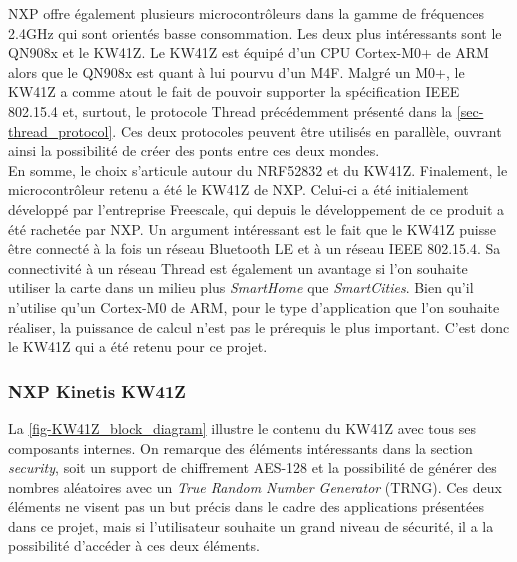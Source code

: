 NXP offre également plusieurs microcontrôleurs dans la gamme de fréquences 2.4GHz qui sont orientés basse consommation. Les deux plus intéressants sont le QN908x et le KW41Z. Le KW41Z est équipé d'un CPU Cortex-M0+ de ARM alors que le QN908x est quant à lui pourvu d'un M4F. Malgré un M0+, le KW41Z a comme atout le fait de pouvoir supporter la spécification IEEE 802.15.4 et, surtout, le protocole Thread précédemment présenté dans la \cref{sec-thread_protocol}. Ces deux protocoles peuvent être utilisés en parallèle, ouvrant ainsi la possibilité de créer des ponts entre ces deux mondes. \\


En somme, le choix s'articule autour du NRF52832 et du KW41Z. Finalement, le microcontrôleur retenu a été le KW41Z de NXP. Celui-ci a été initialement développé par l'entreprise Freescale, qui depuis le développement de ce produit a été rachetée par NXP. Un argument intéressant est le fait que le KW41Z puisse être connecté à la fois un réseau Bluetooth LE et à un réseau IEEE 802.15.4. Sa connectivité à un réseau Thread est également un avantage si l'on souhaite utiliser la carte dans un milieu plus \textit{SmartHome} que \textit{SmartCities}. Bien qu'il n'utilise qu'un Cortex-M0 de ARM, pour le type d'application que l'on souhaite réaliser, la puissance de calcul n'est pas le prérequis le plus important. C'est donc le KW41Z qui a été retenu pour ce projet. 

\FloatBarrier
\subsubsection{NXP Kinetis KW41Z}
\label{sec-hardware_kw41z}

La \cref{fig-KW41Z_block_diagram} illustre le contenu du KW41Z avec tous ses composants internes. On remarque des éléments intéressants dans la section \textit{security}, soit un support de chiffrement AES-128 et la possibilité de générer des nombres aléatoires avec un \textit{True Random Number Generator} (TRNG). Ces deux éléments ne visent pas un but précis dans le cadre des applications présentées dans ce projet, mais si l'utilisateur souhaite un grand niveau de sécurité, il a la possibilité d'accéder à ces deux éléments.\\


